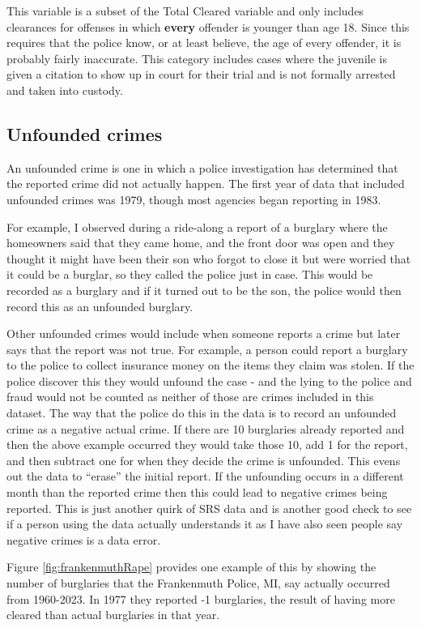 \documentclass[
]{krantz}
\begin{document}
This variable is a subset of the Total Cleared variable and
only includes clearances for offenses in which
\textbf{every} offender is younger than age 18. Since this
requires that the police know, or at least believe, the age
of every offender, it is probably fairly inaccurate. This
category includes cases where the juvenile is given a
citation to show up in court for their trial and is not
formally arrested and taken into custody.

\subsection{Unfounded crimes}\label{unfounded}

An unfounded crime is one in which a police investigation
has determined that the reported crime did not actually
happen. The first year of data that included unfounded
crimes was 1979, though most agencies began reporting in
1983.

For example, I observed during a ride-along a report of a
burglary where the homeowners said that they came home, and
the front door was open and they thought it might have been
their son who forgot to close it but were worried that it
could be a burglar, so they called the police just in case.
This would be recorded as a burglary and if it turned out to
be the son, the police would then record this as an
unfounded burglary.

Other unfounded crimes would include when someone reports a
crime but later says that the report was not true. For
example, a person could report a burglary to the police to
collect insurance money on the items they claim was stolen.
If the police discover this they would unfound the case -
and the lying to the police and fraud would not be counted
as neither of those are crimes included in this dataset. The
way that the police do this in the data is to record an
unfounded crime as a negative actual crime. If there are 10
burglaries already reported and then the above example
occurred they would take those 10, add 1 for the report, and
then subtract one for when they decide the crime is
unfounded. This evens out the data to ``erase'' the initial
report. If the unfounding occurs in a different month than
the reported crime then this could lead to negative crimes
being reported. This is just another quirk of SRS data and
is another good check to see if a person using the data
actually understands it as I have also seen people say
negative crimes is a data error.

Figure \ref{fig:frankenmuthRape} provides one example of
this by showing the number of burglaries that the
Frankenmuth Police, MI, say actually occurred from
1960-2023. In 1977 they reported -1 burglaries, the result
of having more cleared than actual burglaries in that year.
\end{document}
